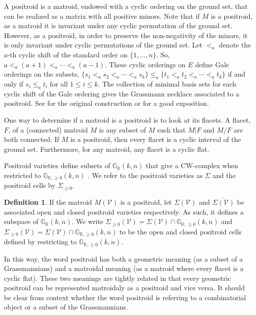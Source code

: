 \documentclass[11pt]{article}
\newcommand{\R}{\mathbb{R}}
\newcommand{\Gr}{\mathbb{G}_{\R, \geq 0}}
\newcommand{\Grall}{\mathbb{G}_{\R}}
\newcommand{\cV}{\mathcal{V}}
\newcommand{\Sigmapos}{\Sigma_{\geq 0}}
\theoremstyle{remark}
\theoremstyle{definition}
\newtheorem{dfn}[thm]{Definition}
\begin{document}
A positroid is a matroid, endowed with a cyclic ordering on the ground set, that can be realized as a matrix with all positive minors. Note that if $M$ is a positroid, as a matroid it is invariant under any cyclic permutation of the ground set. However, as a positroid, in order to  preserve the non-negativity of the minors, it is only invariant under cyclic permutations of the ground set. Let $<_a$ denote the $a$-th cyclic shift of the standard order on $\{1, \dots, n\}$. So, $a <_a (a+1) <_a \cdots <_a (a-1)$. These cyclic orderings on $E$ define Gale orderings on the subsets, $\{s_1 <_a s_2 <_a \cdots <_a s_k\} \leq_a \{t_1 <_a t_2 <_a \cdots <_a t_k\}$ if and only if $s_i \leq_a t_i$ for all $1 \leq i \leq k$. The collection of minimal basis sets for each cyclic shift of the Gale ordering gives the Grassmann necklace associated to a positroid. See \cite[Section 16]{Postnikov} for the original construction or \cite{positroids13} for a good exposition.

One way to determine if a matroid is a positroid is to look at its flacets. A flacet, $F$, of a (connected) matroid $M$ is any subset of $M$ such that $M|F$ and $M/F$ are both connected. If $M$ is a positroid, then every flacet is a cyclic interval of the ground set. Furthermore, for any matroid, any flacet is a cyclic flat.

Positroid varieties define subsets of $\Grall(k,n)$ that give a CW-complex when restricted to $\Gr(k,n)$ \cite[Section 3]{Postnikov}. We refer to the positroid varieties as $\Sigma$ and the positroid cells by  $\Sigmapos$.

\begin{dfn}If the matroid $M(\cV)$ is a positroid, let $\Sigma(\cV)$ and $\overline{\Sigma(\cV)}$ be associated open and closed positroid varieties respectively. As such, it defines a subspace of $\Grall(k,n)$. We write $\Sigmapos(\cV) = \Sigma(\cV) \cap \Gr(k,n)$ and $\overline{\Sigmapos(\cV)} = \Sigma(\cV) \cap \Gr(k,n)$ to be the open and closed positroid cells defined by restricting to $\Gr(k,n)$. \end{dfn} 

In this way, the word positroid has both a geometric meaning (as a subset of a Grassmannians) and a matroidal meaning (as a matroid where every flacet is a cyclic flat). These two meanings are tightly related in that every geometric positroid can be represented matroidaly as a positroid and vice versa. It should be clear from context whether the word positroid is referring to a combinatorial object or a subset of the Grassmannians. %
\end{document}
